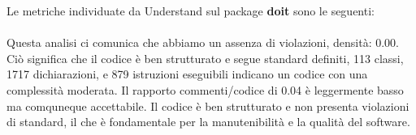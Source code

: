 Le metriche individuate da Understand sul package \textbf{doit} sono le seguenti:\\
\\[2ex]

Questa analisi ci comunica che abbiamo un assenza di violazioni, densità: 0.00.
Ciò significa che il codice è ben strutturato e segue standard definiti,
113 classi, 1717 dichiarazioni, e 879 istruzioni eseguibili indicano un codice con una complessità moderata.
Il rapporto commenti/codice di 0.04 è leggermente basso ma comquneque accettabile.
Il codice è ben strutturato e non presenta violazioni di standard, il che è fondamentale per la manutenibilità e 
la qualità del software.
